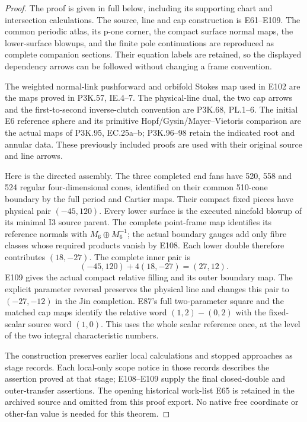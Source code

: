\begin{proof}
The proof is given in full below, including its supporting chart and
intersection calculations. The source, line and cap construction is
E61--E109. The common periodic atlas, its p-one corner, the compact
surface normal maps, the lower-surface blowups, and the finite pole
continuations are reproduced as complete companion sections. Their
equation labels are retained, so the displayed dependency arrows can
be followed without changing a frame convention.

The weighted normal-link pushforward and orbifold Stokes map used in
E102 are the maps proved in P3K.57, IE.4--7. The physical-line dual,
the two cap arrows and the first-to-second inverse-clutch convention
are P3K.68, PL.1--6. The initial E6 reference sphere and its primitive
Hopf/Gysin/Mayer--Vietoris comparison are the actual maps of P3K.95,
EC.25a--b; P3K.96--98 retain the indicated root and annular data. These
previously included proofs are used with their original source and
line arrows.

Here is the directed assembly. The three completed end fans have
520, 558 and 524 regular four-dimensional cones, identified on their
common 510-cone boundary by the full period and Cartier maps. Their
compact fixed pieces have physical pair \((-45,120)\). Every lower
surface is the executed ninefold blowup of its minimal I3 source
parent. The complete point-frame map identifies its reference
normals with \(M_6\oplus M_6^{-1}\); the actual boundary gauges add
only fibre classes whose required products vanish by E108. Each
lower double therefore contributes \((18,-27)\). The complete inner
pair is
\[
 (-45,120)+4(18,-27)=(27,12).
\]
E109 gives the actual compact relative filling and its outer boundary
map. The explicit parameter reversal preserves the physical line and
changes this pair to \((-27,-12)\) in the Jin completion. E87's full
two-parameter square and the matched cap maps identify the relative
word \((1,2)-(0,2)\) with the fixed-scalar source word \((1,0)\).
This uses the whole scalar reference once, at the level of the two
integral characteristic numbers.

The construction preserves earlier local calculations and stopped
approaches as stage records. Each local-only scope notice in those
records describes the assertion proved at that stage; E108--E109
supply the final closed-double and outer-transfer assertions. The
opening historical work-list E65 is retained in the archived source
and omitted from this proof export. No native free coordinate or
other-fan value is needed for this theorem.







\end{proof}
